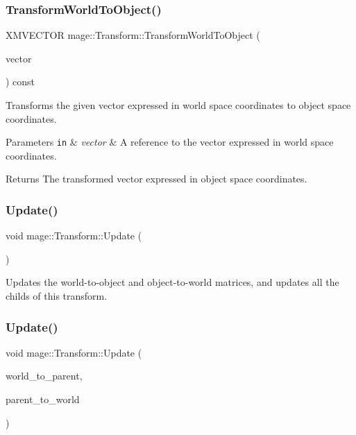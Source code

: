 \subsubsection{\texorpdfstring{Transform\+World\+To\+Object()}{TransformWorldToObject()}}
{\footnotesize\ttfamily X\+M\+V\+E\+C\+T\+OR mage\+::\+Transform\+::\+Transform\+World\+To\+Object (\begin{DoxyParamCaption}\item[{const X\+M\+V\+E\+C\+T\+OR \&}]{vector }\end{DoxyParamCaption}) const}

Transforms the given vector expressed in world space coordinates to object space coordinates.


\begin{DoxyParams}[1]{Parameters}
\mbox{\tt in}  & {\em vector} & A reference to the vector expressed in world space coordinates. \\
\hline
\end{DoxyParams}
\begin{DoxyReturn}{Returns}
The transformed vector expressed in object space coordinates. 
\end{DoxyReturn}
\hypertarget{structmage_1_1_transform_ab80fc4a9bd034540b1d30242c4d9ca90}{}\label{structmage_1_1_transform_ab80fc4a9bd034540b1d30242c4d9ca90} 
\subsubsection{\texorpdfstring{Update()}{Update()}\hspace{0.1cm}{\footnotesize\ttfamily [1/2]}}
{\footnotesize\ttfamily void mage\+::\+Transform\+::\+Update (\begin{DoxyParamCaption}{ }\end{DoxyParamCaption})\hspace{0.3cm}{\ttfamily [private]}}

Updates the world-\/to-\/object and object-\/to-\/world matrices, and updates all the childs of this transform. \hypertarget{structmage_1_1_transform_af0d19db352e703007c26f42a253ab2aa}{}\label{structmage_1_1_transform_af0d19db352e703007c26f42a253ab2aa} 
\subsubsection{\texorpdfstring{Update()}{Update()}\hspace{0.1cm}{\footnotesize\ttfamily [2/2]}}
{\footnotesize\ttfamily void mage\+::\+Transform\+::\+Update (\begin{DoxyParamCaption}\item[{const X\+M\+M\+A\+T\+R\+IX \&}]{world\+\_\+to\+\_\+parent,  }\item[{const X\+M\+M\+A\+T\+R\+IX \&}]{parent\+\_\+to\+\_\+world }\end{DoxyParamCaption})\hspace{0.3cm}{\ttfamily [private]}}

